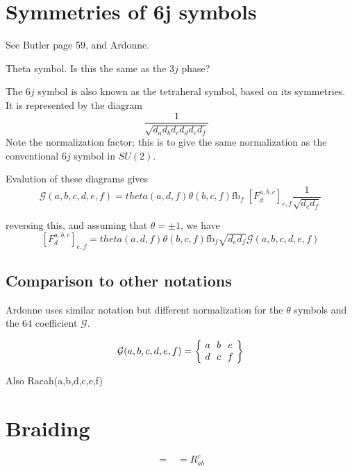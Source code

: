 \documentclass[12pt]{article}
\newcommand{\fsymbol}[6]{\mbox{$\left[ F^{#1,#2,#3}_{#4} \right]_{#5,#6}$}}
\newcommand{\fb}{\mathrm{fb}}
\begin{document}
\section{Symmetries of 6j symbols}


See Butler page 59, and Ardonne\cite{Ardonne}.

Theta symbol.  Is this the same as the $3j$ phase?

The $6j$ symbol is also known as the tetraheral symbol, based on its symmetries.
It is represented by the diagram
\begin{equation}
\frac{1}{\sqrt{d_a d_b d_c d_d d_e d_f}}
\begin{gathered}
%
\end{gathered}
\end{equation}
Note the normalization factor; this is to give the same normalization as the conventional $6j$ symbol
in $SU(2)$.

Evalution of these diagrams gives
\begin{equation}
\mathcal{G}(a,b,c,d,e,f) = theta(a,d,f) \theta(b,c,f) \fb_f \; \fsymbol a b c d e f \frac{1}{\sqrt{d_e d_f}}
\end{equation}

reversing this, and assuming that $\theta = \pm 1$, we have
\begin{equation}
\fsymbol a b c d e f = theta(a,d,f) \theta(b,c,f) \fb_f \sqrt{d_e d_f} \mathcal{G}(a,b,c,d,e,f)
\end{equation}

\subsection{Comparison to other notations}

Ardonne uses similar notation but different normalization for the $\theta$ symbols and the $64$ coefficient
$\mathcal{G}$. 

\begin{equation}
\mathcal{G}(a,b,c,d,e,f) = \qsixj{a}{b}{e}{d}{c}{f}
\end{equation}

Also Racah(a,b,d,c,e,f)

\section{Braiding}

\iffalse

\begin{equation}
\begin{gathered}

\end{gathered}
=
\begin{gathered}

\end{gathered}
= R^c_{ab}
\begin{gathered}

\end{gathered}
\end{equation}
\end{document}
